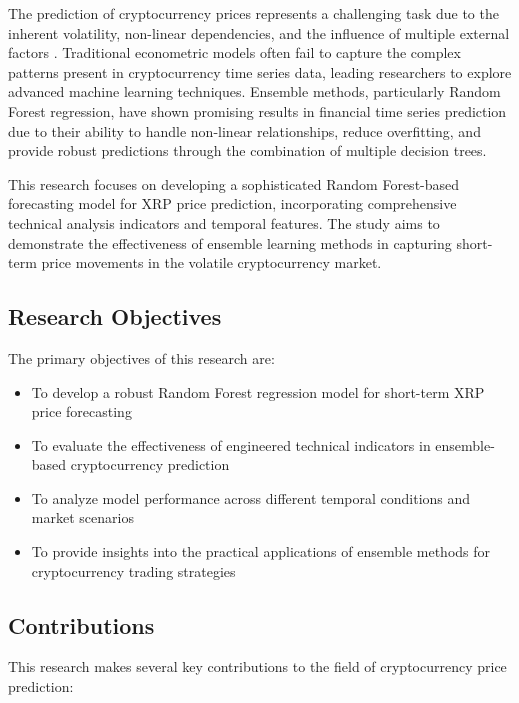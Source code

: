 \documentclass[11pt,a4paper]{article}
\begin{document}
The prediction of cryptocurrency prices represents a challenging task due to the inherent volatility, non-linear dependencies, and the influence of multiple external factors \cite{ji2019does}. Traditional econometric models often fail to capture the complex patterns present in cryptocurrency time series data, leading researchers to explore advanced machine learning techniques. Ensemble methods, particularly Random Forest regression, have shown promising results in financial time series prediction due to their ability to handle non-linear relationships, reduce overfitting, and provide robust predictions through the combination of multiple decision trees.

This research focuses on developing a sophisticated Random Forest-based forecasting model for XRP price prediction, incorporating comprehensive technical analysis indicators and temporal features. The study aims to demonstrate the effectiveness of ensemble learning methods in capturing short-term price movements in the volatile cryptocurrency market.

\subsection{Research Objectives}

The primary objectives of this research are:

\begin{itemize}
    \item To develop a robust Random Forest regression model for short-term XRP price forecasting
    \item To evaluate the effectiveness of engineered technical indicators in ensemble-based cryptocurrency prediction
    \item To analyze model performance across different temporal conditions and market scenarios
    \item To provide insights into the practical applications of ensemble methods for cryptocurrency trading strategies
\end{itemize}

\subsection{Contributions}

This research makes several key contributions to the field of cryptocurrency price prediction:
\end{document}
